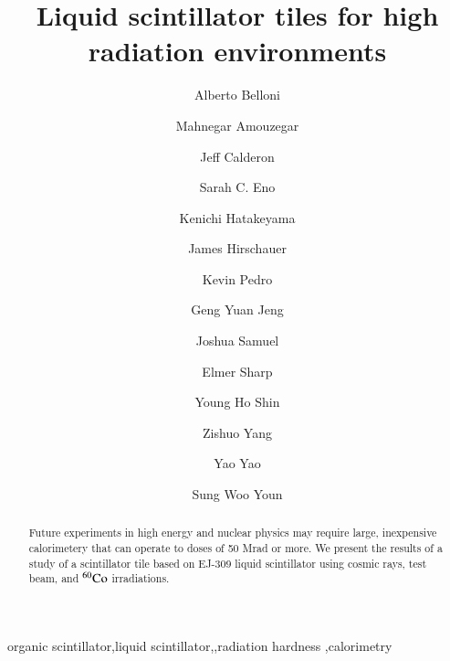 \documentclass[review]{elsarticle}
\begin{document}
\begin{frontmatter}

\title{Liquid scintillator tiles for high radiation environments }


\author[umd]{Alberto Belloni}
\author[umd]{Mahnegar Amouzegar}
\author[umd]{Jeff Calderon}
\author[umd]{Sarah C. Eno}
\author[baylor]{Kenichi Hatakeyama}
\author[fnal]{James Hirschauer}
\author[fnal]{Kevin Pedro}
\author[umd]{Geng Yuan Jeng}
\author[umd]{Joshua Samuel}
\author[elmer]{Elmer Sharp}
\author[umd]{Young Ho Shin}
\author[umd]{Zishuo Yang}
\author[umd]{Yao Yao}
\author[korea]{Sung Woo Youn}




\address[umd]{Dept. Physics, U. Maryland, College Park MD 30742 USA}
\address[eljen]{Eljen Technology, 1300 W. Broadway, Sweetwater, Tx 79556 USA}
\address[korea]{Institute for Basic Science, Center for Axion and Precision Physics Research, IBS Center for Axion and Precision Physics Research
Room 4315, Department of Physics, Natural Science Building (E6-2), KAIST,
291 Daehak-ro, Yuseong-gu, Daejeon 305-701, South Korea}
\address[elmer]{Elmer Sharp Engineering, 7007 Leesville Blvd. Springfield, VA 22151}
\address[fnal]{Fermi National Accelerator Laboratory, Batavia, IL, USA}
\address[baylor]{Baylor University, Waco, Texas, USA}

\begin{abstract}
Future experiments in high energy and nuclear physics may require large, inexpensive calorimetery that can operate to doses of 50 Mrad or more.
We present the results of a study of a scintillator tile based on EJ-309 liquid scintillator using cosmic rays, test beam, and $\rm{^{60}Co}$ irradiations. 
\end{abstract}

\begin{keyword}
organic scintillator\sep liquid scintillator\sep \sep radiation hardness \sep calorimetry
\end{keyword}

\end{frontmatter}

\linenumbers
\end{document}

